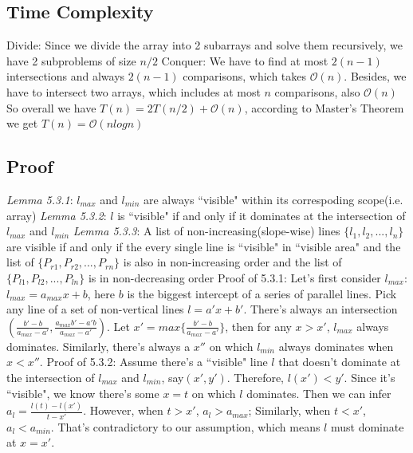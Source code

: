 \documentclass[11pt]{article}
\renewcommand{\O}{\mathcal{O}}
\begin{document}
\subsection{Time Complexity}
	Divide: Since we divide the array into 2 subarrays and solve them recursively, we have 2 subproblems of size $n/2$\newline
	Conquer: We have to find at most $2(n-1)$ intersections and always $2(n-1)$ comparisons, which takes $\O(n)$. Besides, we have to intersect two arrays, which includes at most $n$ comparisons, also $\O(n)$\newline
	So overall we have $T(n) = 2T(n/2) + \O(n)$, according to Master's Theorem we get $T(n) = \O(nlogn)$
\subsection{Proof}
	\emph{Lemma 5.3.1}: $l_{max}$ and $l_{min}$ are always ``visible" within its correspoding scope(i.e. array)\newline
	\emph{Lemma 5.3.2}: $l$ is ``visible" if and only if it dominates at the intersection of $l_{max}$ and $l_{min}$\newline
	\emph{Lemma 5.3.3}: A list of non-increasing(slope-wise) lines $\{l_{1}, l_{2}, ..., l_{n}\}$ are visible if and only if the every single line is ``visible" in ``visible area" and the list of $\{P_{r1}, P_{r2}, ...,  P_{rn}\}$ is also in non-increasing order and the list of $\{P_{l1}, P_{l2}, ...,  P_{ln}\}$ is in non-decreasing order\newline
	\newline
	Proof of 5.3.1: Let's first consider $l_{max}$: $l_{max}=a_{max}x+b$, here $b$ is the biggest intercept of a series of parallel lines. Pick any line of a set of non-vertical lines $l=a'x+b'$. There's always an intersection $(\frac{b'-b}{a_{max}-a'}, \frac{a_{max}b'-a'b}{a_{max}-a'})$. Let $x'=max\{\frac{b'-b}{a_{max}-a'}\}$, then for any $x > x'$, $l_{max}$ always dominates. Similarly, there's always a $x''$ on which $l_{min}$ always dominates when $x < x''$.\newline
	\newline
	Proof of 5.3.2: Assume there's a ``visible" line $l$ that doesn't dominate at the intersection of $l_{max}$ and $l_{min}$, say$(x', y')$. Therefore, $l(x') < y'$. Since it's ``visible", we know there's some $x=t$ on which $l$ dominates. Then we can infer $a_{l}=\frac{l(t)-l(x')}{t-x'}$. However, when $t > x'$, $a_{l} > a_{max}$; Similarly, when $t < x'$, $a_{l} < a_{min}$. That's contradictory to our assumption, which means $l$ must dominate at $x=x'$.\newline
\end{document}
